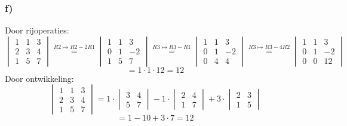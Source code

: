 \documentclass[lineaire_algebra_oplossingen.tex]{subfiles}
\begin{document}
\subsubsection*{f)}
Door rijoperaties:
$$
\begin{vmatrix}
1 & 1 & 3\\
2 & 3 & 4\\
1 & 5 & 7
\end{vmatrix}
\overset{R2 \longmapsto R2-2R1}{=}
\begin{vmatrix}
1 & 1 & 3\\
0 & 1 & -2\\
1 & 5 & 7
\end{vmatrix}
\overset{R3 \longmapsto R3-R1}{=}
\begin{vmatrix}
1 & 1 & 3\\
0 & 1 & -2\\
0 & 4 & 4
\end{vmatrix}
\overset{R3 \longmapsto R3-4R2}{=}
\begin{vmatrix}
1 & 1 & 3\\
0 & 1 & -2\\
0 & 0 & 12
\end{vmatrix}
$$
$$ = 1\cdot 1 \cdot 12 = 12$$
Door ontwikkeling:
$$
\begin{vmatrix}
1 & 1 & 3\\
2 & 3 & 4\\
1 & 5 & 7
\end{vmatrix}
= 1 \cdot
\begin{vmatrix}
3 & 4\\
5 & 7
\end{vmatrix}
- 1 \cdot 
\begin{vmatrix}
2 & 4\\
1 & 7
\end{vmatrix}
+3\cdot
\begin{vmatrix}
2 & 3\\
1 & 5
\end{vmatrix}
$$
$$
= 1 - 10 + 3\cdot 7 = 12
$$
\end{document}
